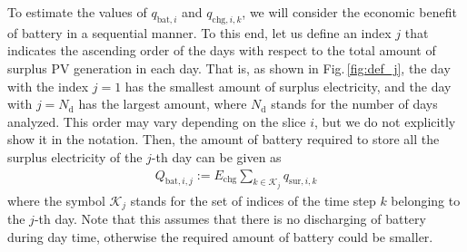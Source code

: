 \documentclass[lettersize,journal]{IEEEtran}
\newcommand{\figref}[1]{Fig.\,\ref{#1}}
\begin{document}
%
To estimate the values of $q_{\mathrm{bat},i}$ and $q_{\mathrm{chg},i,k}$, we will consider the economic benefit of battery in a sequential manner. 
To this end, let us define an index $j$ that indicates the ascending order of the days with respect to the total amount of surplus PV generation in each day. 
That is, as shown in \figref{fig:def_j}, the day with the index $j=1$ has the smallest  amount of surplus electricity, and the day with $j=N_\mathrm{d}$ has the largest amount, where $N_\mathrm{d}$ stands for the number of days analyzed. 
This order may vary depending on the slice $i$, but we do not explicitly show it in the notation. 
Then, the amount of battery required to store all the surplus electricity of the $j$-th day can be given as 
\begin{align}
 Q_{\mathrm{bat}, i,j} := E_\mathrm{chg} \sum_{k \in \mathcal{K}_j}  q_{\mathrm{sur},i, k}     
\end{align}
where the symbol $\mathcal{K}_j$ stands for the set of indices of the time step $k$ belonging to the $j$-th day.
Note that this assumes that there is no discharging of battery during day time, otherwise the required amount of battery could be smaller.  
\end{document}
